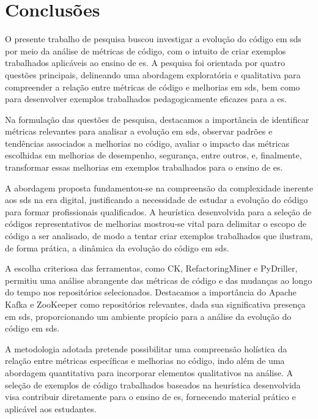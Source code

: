 \chapter{Conclusões}
\label{chapter:conclusions}

O presente trabalho de pesquisa buscou investigar a evolução do código em \gls{sds} por meio da análise de métricas de código, com o intuito de criar exemplos trabalhados aplicáveis ao ensino de \gls{es}. A pesquisa foi orientada por quatro questões principais, delineando uma abordagem exploratória e qualitativa para compreender a relação entre métricas de código e melhorias em \gls{sds}, bem como para desenvolver exemplos trabalhados pedagogicamente eficazes para a \gls{es}.

Na formulação das questões de pesquisa, destacamos a importância de identificar métricas relevantes para analisar a evolução em \gls{sds}, observar padrões e tendências associados a melhorias no código, avaliar o impacto das métricas escolhidas em melhorias de desempenho, segurança, entre outros, e, finalmente, transformar essas melhorias em exemplos trabalhados para o ensino de \gls{es}.

A abordagem proposta fundamentou-se na compreensão da complexidade inerente aos \gls{sds} na era digital, justificando a necessidade de estudar a evolução do código para formar profissionais qualificados. A heurística desenvolvida para a seleção de códigos representativos de melhorias mostrou-se vital para delimitar o escopo de código a ser analisado, de modo a tentar criar exemplos trabalhados que ilustram, de forma prática, a dinâmica da evolução do código em \gls{sds}.

A escolha criteriosa das ferramentas, como CK, RefactoringMiner e PyDriller, permitiu uma análise abrangente das métricas de código e das mudanças ao longo do tempo nos repositórios selecionados. Destacamos a importância do Apache Kafka e ZooKeeper como repositórios relevantes, dada sua significativa presença em \gls{sds}, proporcionando um ambiente propício para a análise da evolução do código em \gls{sds}.

A metodologia adotada pretende possibilitar uma compreensão holística da relação entre métricas específicas e melhorias no código, indo além de uma abordagem quantitativa para incorporar elementos qualitativos na análise. A seleção de exemplos de código trabalhados baseados na heurística desenvolvida visa contribuir diretamente para o ensino de \gls{es}, fornecendo material prático e aplicável aos estudantes.

